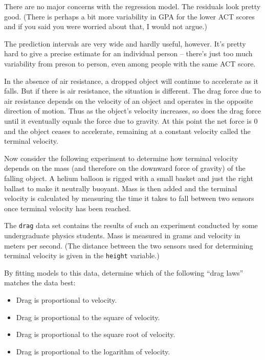 \documentclass[twoside]{book}\usepackage[]{graphicx}\usepackage[]{xcolor}
\newenvironment{knitrout}{}{} %
\def\myindex#1{\index{#1}}
\newcommand{\Rindex}[1]{\index{\texttt{#1}}}
\begin{document}
\begin{solution}
\begin{enumerate}
\begin{knitrout}
{}



\end{knitrout}
			There are no major concerns with the regression model. The
			residuals look pretty good.  (There is perhaps a bit more variability
			in GPA for the lower ACT scores and if you said you were worried about
			that, I would not argue.)  

			The prediction intervals are very wide and hardly useful, however.
			It's pretty hard to give a precise estimate for an individual
			person -- there's just too much variability from preson to person, 
			even among people with the same ACT score. 
	\end{enumerate}
\end{solution}

\begin{problem}
\Rindex{drag}%
\myindex{physics|probidx}%
\label{prob:drag1}
In the absence of air resistance, a dropped object will continue to accelerate
as it falls.  But if there is air resistance, the situation is different.
The drag force due to air resistance depends on the velocity of an object
and operates in the opposite direction of motion.  Thus as the object's velocity
increases, so does the drag force until it eventually equals the force
due to gravity.  At this point the net force is $0$ and the object 
ceases to accelerate, remaining at a constant velocity called the 
terminal velocity.
\myindex{terminal velocity|probidx}

Now consider the following experiment to determine how terminal velocity
depends on the mass (and therefore on the downward force of gravity) of 
the falling object.  A helium balloon is rigged with a small basket and 
just the right ballast to make it neutrally buoyant.  Mass is then added
and the terminal velocity is calculated by measuring the time it takes to
fall between two sensors once terminal velocity has been reached.

The \verb!drag! data set contains the results of such an experiment
conducted by some undergraduate physics students.  Mass is measured 
in grams and velocity in meters per second.  
(The distance between the two sensors used for determining
terminal velocity is given in the \verb!height! variable.)

By fitting models to this data, determine which of the following ``drag laws'' matches the data best:
\begin{itemize}
\item
Drag is proportional to velocity.
\item
Drag is proportional to the square of velocity.
\item
Drag is proportional to the square root of velocity.
\item
Drag is proportional to the logarithm of velocity.
\end{itemize}
\end{problem}
\end{document}
